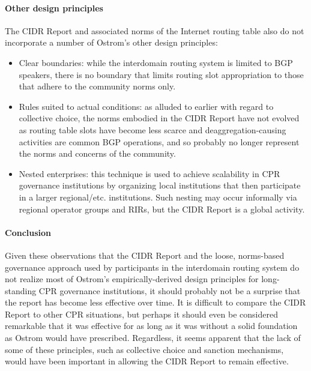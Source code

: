\paragraph{Other design principles}
The CIDR Report and associated norms of the Internet routing table also do not
incorporate a number of Ostrom's other design principles:

\begin{itemize}
\item{Clear boundaries: while the interdomain routing system is limited to BGP
speakers, there is no boundary that limits routing slot appropriation to those
that adhere to the community norms only.}
\item{Rules suited to actual conditions: as alluded to earlier with regard to
collective choice, the norms embodied in the CIDR Report have not evolved as
routing table slots have become less scarce and deaggregation-causing
activities are common BGP operations, and so probably no longer represent the
norms and concerns of the community.}
\item{Nested enterprises: this technique is used to achieve scalability in CPR
governance institutions by organizing local institutions that then participate
in a larger regional/etc. institutions. Such nesting may occur informally via
regional operator groups and RIRs, but the CIDR Report is a global activity.}
\end{itemize}

\paragraph{Conclusion}
Given these observations that the CIDR Report and the loose, norms-based
governance approach used by participants in the interdomain routing system do
not realize most of Ostrom's empirically-derived design principles for
long-standing CPR governance institutions, it should probably not be a surprise
that the report has become less effective over time. It is difficult to compare
the CIDR Report to other CPR situations, but perhaps it should even be
considered remarkable that it was effective for as long as it was without a
solid foundation as Ostrom would have prescribed. Regardless, it seems apparent
that the lack of some of these principles, such as collective choice and
sanction mechanisms, would have been important in allowing the CIDR Report to
remain effective.

